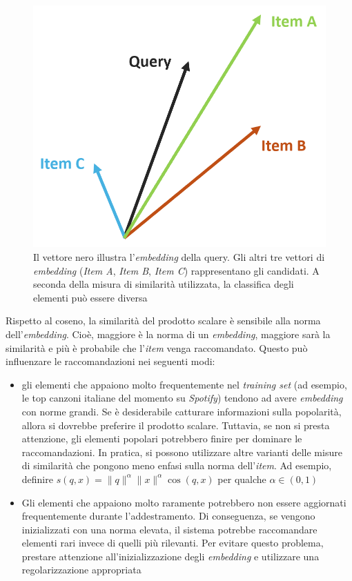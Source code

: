 \begin{figure}[H]
    \centering
    \includegraphics[scale=0.8]{figures/embedding.PNG}
    \caption{Il vettore nero illustra l'\textit{embedding} della query. Gli altri tre vettori di \textit{embedding} (\textit{Item A}, \textit{Item B}, \textit{Item C}) rappresentano gli  candidati. A seconda della misura di similarità utilizzata, la classifica degli elementi può essere diversa}
    \label{fig:embedding}
\end{figure}

Rispetto al coseno, la similarità del prodotto scalare è sensibile alla norma dell'\textit{embedding}. Cioè, maggiore è la norma di un \textit{embedding}, maggiore sarà la similarità e più è probabile che l'\textit{item} venga raccomandato. Questo può influenzare le raccomandazioni nei seguenti modi:

\begin{itemize}
    \item gli elementi che appaiono molto frequentemente nel \textit{training set} (ad esempio, le top canzoni italiane del momento su \textit{Spotify}) tendono ad avere \textit{embedding} con norme grandi. Se è desiderabile catturare informazioni sulla popolarità, allora si dovrebbe preferire il prodotto scalare. Tuttavia, se non si presta attenzione, gli elementi popolari potrebbero finire per dominare le raccomandazioni. In pratica, si possono utilizzare altre varianti delle misure di similarità che pongono meno enfasi sulla norma dell'\textit{item}. Ad esempio, definire $s(q, x) = \|q\|^{\alpha} \|x\|^{\alpha} \cos(q, x)$ per qualche $\alpha \in (0,1)$
    \item Gli elementi che appaiono molto raramente potrebbero non essere aggiornati frequentemente durante l'addestramento. Di conseguenza, se vengono inizializzati con una norma elevata, il sistema potrebbe raccomandare elementi rari invece di quelli più rilevanti. Per evitare questo problema, prestare attenzione all'inizializzazione degli \textit{embedding} e utilizzare una regolarizzazione appropriata
\end{itemize}


